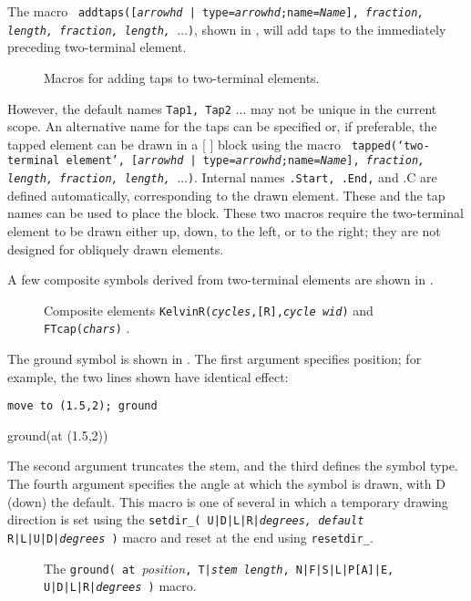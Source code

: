 The macro {\tt
    addtaps([{\sl arrowhd} | type={\sl arrowhd};name={\sl Name}],
    {\sl fraction, length, fraction, length,}
    $\ldots$)},
shown in , will add taps to the
immediately preceding two-terminal element.
\begin{figure}[ht]
   
   \caption{Macros for adding taps to two-terminal elements.}
   \label{Taps}
   \end{figure}
However, the default names
{\tt Tap1, Tap2} $\ldots$ may not be unique in the current scope.  An
alternative name for the taps can be specified or, if preferable, the
tapped element can be drawn in a [ ] block using the macro {\tt
  tapped(`{\sl two-terminal element}',
  [{\sl arrowhd} | type={\sl arrowhd};name={\sl Name}],
    {\sl fraction, length, fraction, length,} $\ldots$)}.
   Internal names {\tt .Start, .End,} and {.C} are defined automatically,
   corresponding to the drawn element. These and the tap names can be used
   to place the block.
These two macros require the two-terminal element to be drawn either up,
down, to the left, or to the right; they are not designed for obliquely
drawn elements.

A few composite symbols derived from two-terminal elements
are shown in .
\begin{figure}[ht]
   \vspace*{-0.5ex}
   
   \vspace*{-0.5ex}
   \caption{Composite elements {\tt KelvinR({\sl cycles},[R],{\sl cycle wid})}
      and {\tt FTcap({\sl chars})} .}
   \label{Composite}
   \end{figure}

The ground symbol is shown in .
The first argument specifies position; for example, the two lines shown
have identical effect:
\par
{\tt move to (1.5,2); ground
\par
ground(at (1.5,2)) }

The second argument truncates
the stem, and the third defines the symbol type.
The fourth argument specifies the angle at which the symbol is drawn,
with D (down) the default.
This macro is one of several in which a temporary drawing direction
is set using the
 {\tt setdir\_( U|D|L|R|{\sl degrees, default} R|L|U|D|{\sl degrees} )}
macro and reset at the end using {\tt resetdir\_}.
\begin{figure}[ht!]
   
   \caption{The 
     {\tt ground( at }{\sl position}{\tt,
       T|{\sl stem length}, N|F|S|L|P[A]|E, U|D|L|R|{\sl degrees} )}
     macro.}
   \label{Grounds}
   \end{figure}

